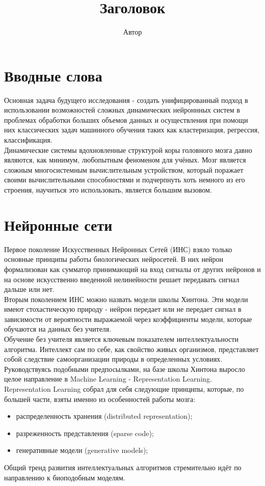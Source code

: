 \documentclass[a4paper,10pt]{article}
\title{Заголовок}
\author{Автор}
\begin{document}
\section*{Вводные слова}
\indent
\indent Основная задача будущего исследования - создать унифицированный подход в использовании возможностей сложных динамических нейроннных систем в проблемах обработки больших объемов данных и осуществления при помощи них классических задач машинного обучения таких как кластеризация, регрессия, классификация.\\
\indent Динамические системы вдохновленные структурой коры головного мозга давно являются, как минимум, любопытным феноменом для учёных. Мозг является сложным многосистемным вычислительным устройством, который поражает своими вычислительными способностями и подчерпнуть хоть немного из его строения, научиться это использовать, является большим вызовом.\\

\section*{Нейронные сети}
\indent
\indent Первое поколение Искусственных Нейронных Сетей (ИНС) взяло только основные принципы работы биологических нейросетей. В них нейрон формализован как сумматор принимающий на вход сигналы от других нейронов и на основе искусственно введенной нелинейности решает передавать сигнал дальше или нет.\\
\indent Вторым поколением ИНС можно назвать модели школы Хинтона. Эти модели имеют стохастическую природу - нейрон передает или не передает сигнал в зависимости от вероятности выражаемой через коэффициенты модели, которые обучаются на данных без учителя.\\ 
\indent Обучение без учителя является ключевым показателем интеллектуальности алгоритма. Интеллект сам по себе, как свойство живых организмов, представляет собой следствие самоорганизации природы в определенных условиях. Руководствуясь подобными предпосылками, на базе школы Хинтона выросло целое направление в Machine Learning - Representation Learning.\\
\indent Representation Learning собрал для себя следующие принципы, которые, по большей части, взяты именно из особенностей работы мозга: 
\begin{itemize}
\item распределенность хранения (distributed representation);
\item разреженность представления (sparse code);
\item генеративные модели (generative models);
\end{itemize}
Общий тренд развития интеллектуальных алгоритмов стремительно идёт по направлению к биоподобным моделям.
\end{document}
